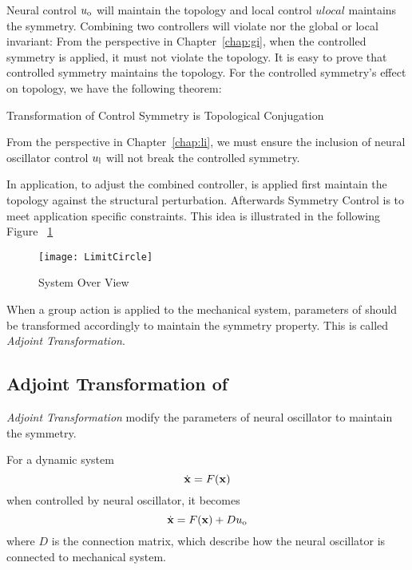 Neural control $u_{\mathrm{o}}$ will maintain the topology and local control $ulocal$  maintains the symmetry.
Combining two controllers will violate nor the global or local invariant:
From the perspective in Chapter~\ref{chap:gi},
when the controlled symmetry  is applied, it must not violate the topology. 
It is easy to prove that controlled symmetry maintains the topology.
For the controlled symmetry's effect on topology, we have the following theorem:

\begin{mythe}
Transformation of Control Symmetry is Topological Conjugation
\end{mythe}


From the perspective in Chapter~\ref{chap:li},
we must ensure the inclusion of neural oscillator control $u_{\mathrm{l}}$ will not break the controlled symmetry.


In application, to adjust the combined controller,
\cpg is applied first maintain the topology against the structural perturbation. 
Afterwards Symmetry Control is to meet application specific constraints.
This idea is illustrated in the following Figure ~\ref{fig:sysoverview}

\begin{figure}[!htbp]
  \begin{center}
      \texttt{[image: LimitCircle]}
    \caption{System Over View }
    \label{fig:sysoverview}
  \end{center}
\end{figure}

When a group action is applied to the mechanical system, parameters of \cpg should be transformed accordingly to maintain the symmetry property.
This is called \emph{Adjoint Transformation}.









\subsection{Adjoint Transformation of \cpg}
\emph{Adjoint Transformation} modify the parameters of neural oscillator to maintain the symmetry.

For a dynamic system 
\[
\dot{\mathbf{x}}=F(\mathbf{x})
\]
when controlled by neural oscillator, it becomes 
\begin{equation}
\label{eq:gc}
\dot{\mathbf{x}}=F(\mathbf{x})+Du_{\mathrm{o}}
\end{equation}
where $D$ is the connection matrix, which describe how the neural oscillator is connected to mechanical system.


